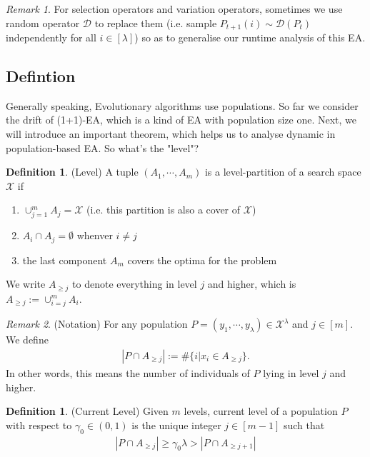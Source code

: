 \documentclass[a4paper,11pt]{report}
\theoremstyle{plain} %
\theoremstyle{definition} %
\newtheorem{defn}[thm]{Definition}
\theoremstyle{remark} %
\newtheorem*{rem}{Remark}
\begin{document}
\begin{rem} For selection operators and variation operators, sometimes we use random operator $\mathcal{D}$ to replace them (i.e. sample $P_{t+1}(i) \sim \mathcal{D}(P_{t})$ independently for all $i\in [\lambda]$) so as to generalise our runtime analysis of this EA.  

\end{rem}

\subsection{Defintion}
\par Generally speaking, Evolutionary algorithms use populations. So far we consider the drift of (1+1)-EA, which is a kind of EA with population size one. Next, we will introduce an important theorem, which helps us to analyse dynamic in population-based EA. So what's the "level"?

\begin{defn}(Level) A tuple $(A_{1}, \cdots ,A_{m})$ is a level-partition of a search space $\mathcal{X}$ if 
\begin{enumerate}
    \item $\cup_{j=1}^m A_{j} =\mathcal{X}$ (i.e. this partition is also a cover of $\mathcal{X}$)
    
    \item $A_{i} \cap A_{j} = \emptyset$ whenver $i \neq j$ 
    
    \item the last component $A_{m}$ covers the optima for the problem
    
\end{enumerate}

\par We write $A_{\geq j}$ to denote everything in level $j$ and higher, which is $A_{\geq j}:= \cup_{i=j}^m A_{i}$.

\end{defn}
\begin{rem} (Notation) For any population $P=(y_{1},\cdots ,y_{\lambda}) \in \mathcal{X}^{\lambda}$ and $j \in [m]$. We define 
\begin{align*}
    |P \cap A_{\geq j}| := \# \{i | x_{i} \in A_{\geq j} \}.
\end{align*}
In other words, this means the number of individuals of $P$ lying in level $j$ and higher.

\end{rem}

\begin{defn}(Current Level) Given $m$ levels, current level of a population $P$ with respect to $\gamma_{0} \in (0,1)$ is the unique integer $j \in [m-1]$ such that  
\begin{align*}
    |P \cap A_{\geq j}| \geq \gamma_{0} \lambda > |P \cap A_{\geq j+1}|
\end{align*}
\end{defn}
\end{document}
